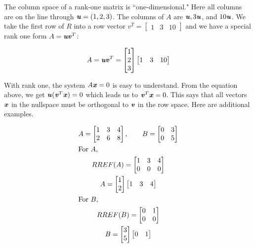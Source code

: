 \documentclass[12pt, letterpaper]{article}
\newcommand{\V}[1]{\textbf{\textit{#1}}}
\theoremstyle{definition}
\begin{document}
	The column space of a rank-one matrix is ``one-dimensional." Here all columns are on the line through $\V{u}=(1,2,3)$. The columns of $A$ are $\V{u}, 3\V{u}$, and $10\V{u}$. We take the first row of $R$ into a row vector $v^T = \begin{bmatrix} 1 & 3 & 10 \end{bmatrix}$ and we have a special rank one form $A=\V{uv}^T$:
				
				\begin{gather*}
					A = \V{uv}^T = \begin{bmatrix} 1 \\ 2 \\ 3 \end{bmatrix} \begin{bmatrix} 1 & 3 & 10 \end{bmatrix}
				\end{gather*}
				
	With rank one, the system $A\V{x} = 0$ is easy to understand. From the equation above, we get $\V{u}(\V{v}^T \V{x})=0$ which leads us to $\V{v}^T \V{x} = 0$. This says that all vectors $\V{x}$ in the nullspace must be orthogonal to $\V{v}$ in the row space. Here are additional examples.
	
	
	\begin{gather*}
	A = \begin{bmatrix}
			1 & 3 & 4 \\
			2 & 6 & 8 
			\end{bmatrix}, \qquad B = \begin{bmatrix}
											0 & 3 \\
											0 & 5
											\end{bmatrix} \\
	\intertext{For $A$,}
		RREF(A) = \begin{bmatrix}
					1 & 3 & 4 \\
					0 & 0 & 0
					\end{bmatrix} \\
		A = \begin{bmatrix} 1\\ 2 \end{bmatrix} \begin{bmatrix} 1 & 3 & 4 \end{bmatrix} \\
	\intertext{For $B$,}
		RREF(B) = \begin{bmatrix}
					0 & 1 \\
					0 & 0
					\end{bmatrix} \\
		B = \begin{bmatrix} 3\\ 5 \end{bmatrix} \begin{bmatrix} 0 & 1 \end{bmatrix}
	\end{gather*}
	
\end{document}
